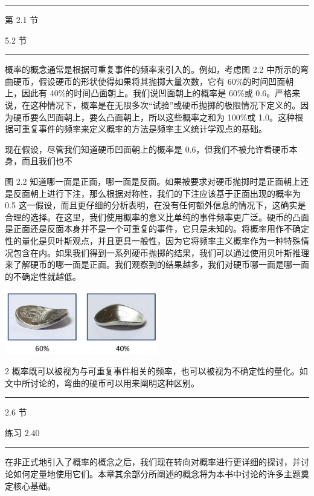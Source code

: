 \documentclass[10pt]{report}
\newcommand{\HRule}{\begin{center}\rule{0.9\linewidth}{0.2mm}\end{center}}
\begin{document}
\HRule

第 2.1 节

5.2 节

\HRule

概率的概念通常是根据可重复事件的频率来引入的。例如，考虑图 2.2 中所示的弯曲硬币，假设硬币的形状使得如果将其抛掷大量次数，它有 60\%的时间凹面朝上，因此有 40\%的时间凸面朝上。我们说凹面朝上的概率是 60\%或 0.6。严格来说，在这种情况下，概率是在无限多次“试验”或硬币抛掷的极限情况下定义的。因为硬币要么凹面朝上，要么凸面朝上，所以这些概率之和为 100\%或 1.0。这种根据可重复事件的频率来定义概率的方法是频率主义统计学观点的基础。

现在假设，尽管我们知道硬币凹面朝上的概率是 0.6，但我们不被允许看硬币本身，而且我们也不

图 2.2 知道哪一面是正面，哪一面是反面。如果被要求对硬币抛掷时是正面朝上还是反面朝上进行下注，那么根据对称性，我们的下注应该基于正面出现的概率为 0.5 这一假设，而且更仔细的分析表明，在没有任何额外信息的情况下，这确实是合理的选择。在这里，我们使用概率的意义比单纯的事件频率更广泛。硬币的凸面是正面还是反面本身并不是一个可重复的事件，它只是未知的。将概率用作不确定性的量化是贝叶斯观点，并且更具一般性，因为它将频率主义概率作为一种特殊情况包含在内。如果我们得到一系列硬币抛掷的结果，我们可以通过使用贝叶斯推理来了解硬币的哪一面是正面。我们观察到的结果越多，我们对硬币哪一面是哪一面的不确定性就越低。

\begin{center}
\includegraphics[max width=0.5\textwidth]{images/0194e279-9b28-703a-88f4-c3ac21e2010d_44_902_348_646_267_0.jpg}
\end{center}
\hspace*{3em} 

2 概率既可以被视为与可重复事件相关的频率，也可以被视为不确定性的量化。如文中所讨论的，弯曲的硬币可以用来阐明这种区别。

\HRule

2.6 节

练习 2.40

\HRule

在非正式地引入了概率的概念之后，我们现在转向对概率进行更详细的探讨，并讨论如何定量地使用它们。本章其余部分所阐述的概念将为本书中讨论的许多主题奠定核心基础。
\end{document}
